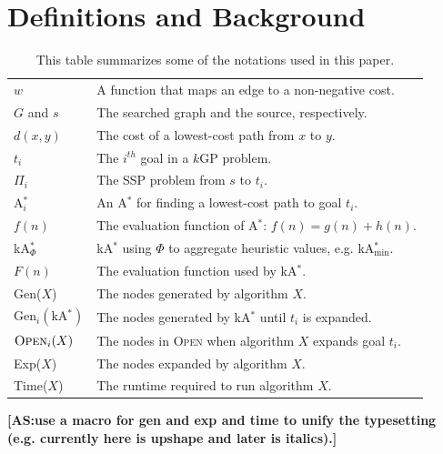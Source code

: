 \documentclass[twoside,11pt]{article}
\newcommand{\kgs}{$k$GP\xspace}
\newcommand{\astar}{A$^*$\xspace}
\newcommand{\kastar}{kA$^*$\xspace}
\newcommand{\kastarvar}[1]{\textup{kA}$^*_{#1}$\xspace}
\newcommand{\kastarmin}{\kastarvar{\min}}
\newcommand{\kastarphi}{\textup{kA}$^*_{\Phi}$\xspace}
\newcommand{\astari}[1]{A$^*_{#1}$\xspace}
\newcommand{\minf}{$F_{min}(n)$\xspace}
\newcommand{\open}{\textsc{Open}\xspace}
\newcommand{\roni}[1]{\textbf{[RS:#1]}}
\newcommand{\abda}[1]{\textbf{[AS:#1]}}
\begin{document}

\section{Definitions and Background}



\begin{table}
  \centering
  \caption{This table summarizes some of the notations used in this paper.}
  \label{tab:notations}
  \footnotesize
  \begin{tabular}{|l|m{78mm}|}
    \hline
    $w$         & A function that maps an edge to a non-negative cost.  \\
    $G$ and $s$ & The searched graph and the source, respectively. \\
    $d(x, y)$   & The cost of a lowest-cost path from $x$ to $y$. \\
    $t_i$       & The $i^{th}$ goal in a \kgs problem. \\
    $\Pi_i$     & The SSP problem from $s$ to $t_i$. \\
    \astari{i}  & An \astar for finding a lowest-cost path to goal $t_i$. \\
    $f(n)$      & The evaluation function of \astar: $f(n)=g(n)+h(n)$. \\
    \kastarphi  & \kastar using $\Phi$ to aggregate heuristic values, e.g. \kastarmin.\\
    $F(n)$      & The evaluation function used by \kastar. \\
    Gen($X$)    & The nodes generated by algorithm $X$. \\
    Gen$_i(\text{\kastar})$ & The nodes generated by \kastar until $t_i$ is expanded. \\
    $\open_i(X)$ & The nodes in \open when algorithm $X$ expands goal $t_i$.\\
    Exp($X$)    & The nodes expanded by algorithm $X$. \\
    Time($X$)   & The runtime required to run algorithm $X$. \\
    \hline
  \end{tabular}

  \abda{use a macro for gen and exp and time to unify the typesetting (e.g. currently here is upshape and later is italics).}
\end{table}
\end{document}
